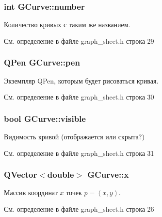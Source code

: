 \subsubsection[{\texorpdfstring{number}{number}}]{\setlength{\rightskip}{0pt plus 5cm}int G\+Curve\+::number}\hypertarget{struct_g_curve_a67acaf70967bdbaa8c02c614502baacc}{}\label{struct_g_curve_a67acaf70967bdbaa8c02c614502baacc}
Количество кривых с таким же названием. 

См. определение в файле graph\+\_\+sheet.\+h строка 29

\subsubsection[{\texorpdfstring{pen}{pen}}]{\setlength{\rightskip}{0pt plus 5cm}Q\+Pen G\+Curve\+::pen}\hypertarget{struct_g_curve_ac3f500b2153788be5232dc7a623354ce}{}\label{struct_g_curve_ac3f500b2153788be5232dc7a623354ce}
Экземпляр Q\+Pen, которым будет рисоваться кривая. 

См. определение в файле graph\+\_\+sheet.\+h строка 30

\subsubsection[{\texorpdfstring{visible}{visible}}]{\setlength{\rightskip}{0pt plus 5cm}bool G\+Curve\+::visible}\hypertarget{struct_g_curve_ac00a68184b569dda559808f50729f96a}{}\label{struct_g_curve_ac00a68184b569dda559808f50729f96a}
Видимость кривой (отображается или скрыта?) 

См. определение в файле graph\+\_\+sheet.\+h строка 31

\subsubsection[{\texorpdfstring{x}{x}}]{\setlength{\rightskip}{0pt plus 5cm}Q\+Vector$<$double$>$ G\+Curve\+::x}\hypertarget{struct_g_curve_af4a77d5615109cd4068e11dcc2b52615}{}\label{struct_g_curve_af4a77d5615109cd4068e11dcc2b52615}
Массив координат $x$ точек $p = (x,y)$. 

См. определение в файле graph\+\_\+sheet.\+h строка 26

